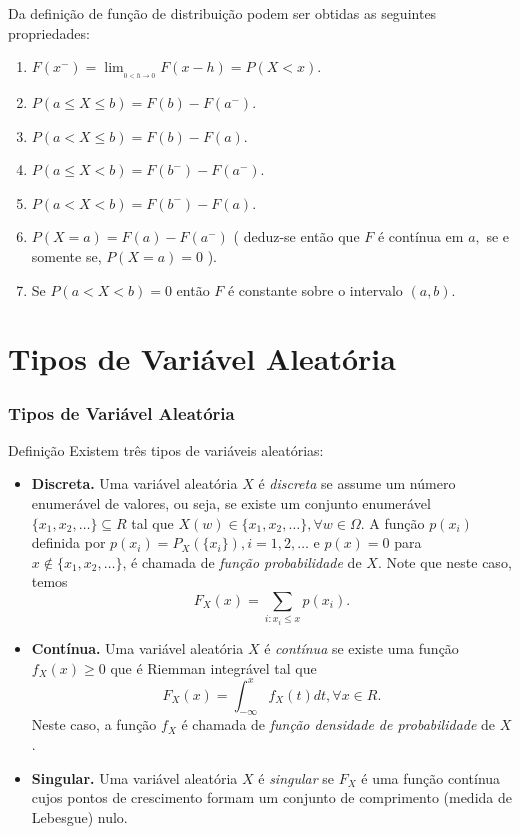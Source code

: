 \begin{frame}

\begin{exer}
Da definição de função de distribuição podem ser obtidas as seguintes pro\-prieda\-des:
	
	\begin{enumerate}
		
		\item  $F(x^{-})={\lim_{_{0<h\rightarrow 0}} }F(x-h)=P(X<x).$
		
		\item $P(a\leq X\leq b)=F(b)-F(a^{-}).$
		
		\item $P(a<X\leq b)=F(b)-F(a).$
		
		\item $P(a\leq X<b)=F(b^{-})-F(a^{-}).$
		
		\item $P(a<X<b)=F(b^{-})-F(a).$
		
		\item $P(X=a)=F(a)-F(a^{-})$ ( deduz-se então que $F$ é contínua em $a,$ se e somente se, $P(X=a)=0$ ).
		
		\item Se $P(a<X<b)=0$ então $F$ é constante sobre o intervalo $(a,b).$
		\end{enumerate}
\end{exer}
\end{frame}


%
\section{Tipos de Variável Aleatória}
\begin{frame}
\frametitle{\textbf{Tipos de Variável Aleatória}}
\begin{block}{Definição}
Existem três tipos de variáveis aleatórias:
\begin{itemize}
\item {\bf Discreta.} Uma variável aleatória $X$ é {\em discreta} se assume um
número enumerável de valores, ou seja, se existe um conjunto
enumerável $\{x_1,x_2,\ldots\}\subseteq R$ tal que $X(w)\in
\{x_1,x_2,\ldots\}, \forall w\in\Omega$. A função $p(x_i)$ definida
por $p(x_i)=P_X(\{x_i\}), i=1,2,\ldots$ e $p(x)=0$ para $x\notin
\{x_1,x_2,\ldots\}$, é chamada de {\em função probabilidade} de $X$. Note que neste caso, temos
$$F_X(x)=\sum_{i:x_i\leq x}p(x_i).$$

\item {\bf Contínua.} Uma variável aleatória $X$ é {\em contínua}  se
existe uma função $f_X(x)\geq 0$ que é Riemman integrável tal que
%
$$F_X(x)=\int_{-\infty}^{x}f_X(t)dt, \forall x\in R.$$
Neste caso, a função $f_X$ é chamada de {\em função densidade de
probabilidade} de $X$.
\item {\bf Singular.} Uma variável aleatória $X$ é {\em singular} se
$F_X$ é uma função contínua cujos pontos de crescimento formam um
conjunto de comprimento (medida de Lebesgue) nulo.
\end{itemize}
\end{block}

\end{frame}

